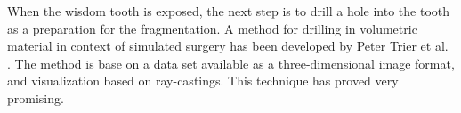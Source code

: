 When the wisdom tooth is exposed, the next step is to drill a hole into the
tooth as a preparation for the fragmentation.
A method for drilling in volumetric material in context of simulated
surgery has been developed by Peter Trier et al.
. The method is base on a data set 
available as a three-dimensional image format, and visualization
based on ray-castings. This technique has proved very promising. \\

